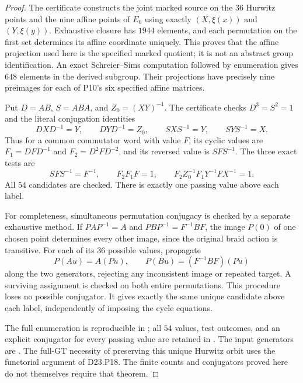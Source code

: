 \begin{proof}
The certificate constructs the joint marked source on the
$36$ Hurwitz points and the nine affine points of $E_0$ using
exactly $(X,\xi(x))$ and $(Y,\xi(y))$. Exhaustive closure has
$1944$ elements, and each permutation on the first set determines
its affine coordinate uniquely. This proves that the affine
projection used here is the specified marked quotient; it is
not an abstract group identification. An exact Schreier--Sims
computation followed by enumeration gives $648$ elements in
the derived subgroup. Their projections have precisely nine
preimages for each of P10's six specified affine matrices.

Put $D=AB$, $S=ABA$, and $Z_0=(XY)^{-1}$. The certificate
checks $D^3=S^2=1$ and the literal conjugation identities
\[
 DXD^{-1}=Y,\qquad DYD^{-1}=Z_0,\qquad
 SXS^{-1}=Y,\qquad SYS^{-1}=X.
\]
Thus for a common commutator word with value $F$, its cyclic
values are $F_1=DFD^{-1}$ and $F_2=D^2FD^{-2}$, and its
reversed value is $SFS^{-1}$. The three exact tests are
\[
 SFS^{-1}=F^{-1},\qquad F_2F_1F=1,\qquad
 F_2Z_0^{-1}F_1Y^{-1}FX^{-1}=1.
\]
All $54$ candidates are checked. There is exactly one passing
value above each label.

For completeness, simultaneous permutation conjugacy is checked
by a separate exhaustive method. If $PAP^{-1}=A$ and
$PBP^{-1}=F^{-1}BF$, the image $P(0)$ of one chosen point
determines every other image, since the original braid action
is transitive. For each of its $36$ possible values, propagate
\[
 P(Au)=A(Pu),\qquad P(Bu)=(F^{-1}BF)(Pu)
\]
along the two generators, rejecting any inconsistent image or
repeated target. A surviving assignment is checked on both
entire permutations. This procedure loses no possible
conjugator. It gives exactly the same unique candidate above
each label, independently of imposing the cycle equations.

The full enumeration is reproducible in
; all $54$ values,
test outcomes, and an explicit conjugator for every passing
value are retained in
.
The input generators are
.
The full-GT necessity of preserving this unique Hurwitz orbit
uses the functorial argument of D23.P18. The finite counts and
conjugators proved here do not themselves require that theorem.
\end{proof}

